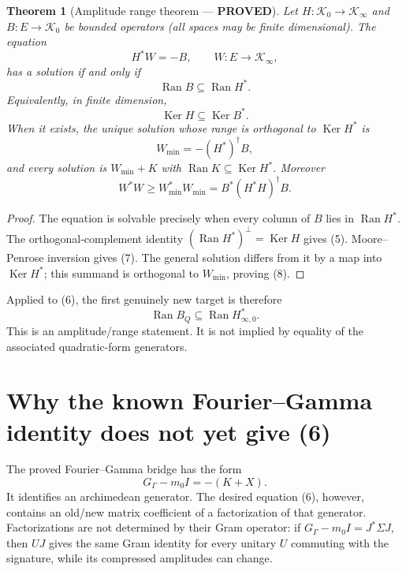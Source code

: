 \documentclass[11pt]{article}
\newtheorem{theorem}{Theorem}
\newcommand{\PROVED}{\textcolor{green!45!black}{\textbf{PROVED}}}
\newcommand{\Ran}{\operatorname{Ran}}
\newcommand{\Ker}{\operatorname{Ker}}
\begin{document}
\begin{theorem}[Amplitude range theorem --- \PROVED]
Let $H:\mathcal K_0\to\mathcal K_\infty$ and
$B:E\to\mathcal K_0$ be bounded operators (all spaces may be finite
dimensional).  The equation
\[
 H^*W=-B,\qquad W:E\to\mathcal K_\infty,
\]
has a solution if and only if
\begin{equation}
 \Ran B\subseteq\Ran H^*.                                \tag{4}
\end{equation}
Equivalently, in finite dimension,
\begin{equation}
 \Ker H\subseteq\Ker B^*.                               \tag{5}
\end{equation}
When it exists, the unique solution whose range is orthogonal to $\Ker H^*$ is
\begin{equation}
 W_{\min}=-(H^*)^\dagger B,                              \tag{7}
\end{equation}
and every solution is $W_{\min}+K$ with $\Ran K\subseteq\Ker H^*$.  Moreover
\begin{equation}
 W^*W\ge W_{\min}^*W_{\min}
 =B^*(H^*H)^\dagger B.                                  \tag{8}
\end{equation}
\end{theorem}

\begin{proof}
The equation is solvable precisely when every column of $B$ lies in
$\Ran H^*$.  The orthogonal-complement identity
$(\Ran H^*)^\perp=\Ker H$ gives (5).  Moore--Penrose inversion gives (7).
The general solution differs from it by a map into $\Ker H^*$; this summand is
orthogonal to $W_{\min}$, proving (8).
\end{proof}

Applied to (6), the first genuinely new target is therefore
\begin{equation}
 \boxed{\Ran B_Q\subseteq\Ran H_{\infty,0}^*.}           \tag{9}
\end{equation}
This is an amplitude/range statement.  It is not implied by equality of the
associated quadratic-form generators.

\section{Why the known Fourier--Gamma identity does not yet give (6)}

The proved Fourier--Gamma bridge has the form
\begin{equation}
 G_\Gamma-m_0I=-(K+X).                                  \tag{10}
\end{equation}
It identifies an archimedean generator.  The desired equation (6), however,
contains an old/new matrix coefficient of a factorization of that generator.
Factorizations are not determined by their Gram operator: if
$G_\Gamma-m_0I=J^*\Sigma J$, then $UJ$ gives the same Gram identity for every
unitary $U$ commuting with the signature, while its compressed amplitudes can
change.
\end{document}
